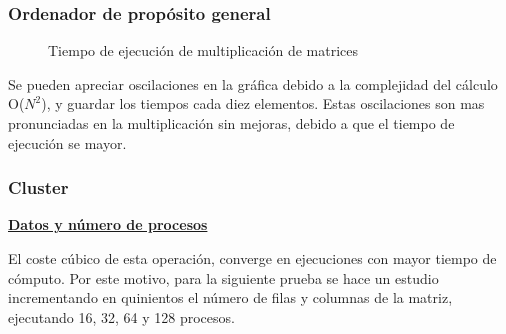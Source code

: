 		
	
		\subsubsection{Ordenador de propósito general}
		
		\begin{figure}[!h]
		\centering
		\caption{Tiempo de ejecución de multiplicación de matrices}
		\end{figure}
		
		Se pueden apreciar oscilaciones en la gráfica debido a la complejidad del cálculo O($N^{2}$), y guardar los tiempos cada diez elementos. Estas oscilaciones son mas pronunciadas en la multiplicación sin mejoras, debido a que el tiempo de ejecución se mayor.
		\newpage
		
		\subsubsection{Cluster}
		
			\begin{flushleft}
			\begin{mdframed}[roundcorner=5pt]			
				\textbf{\underline{Datos y número de procesos}}
				\vspace{0.1cm}
				
				\scriptsize	
				El coste cúbico de esta operación, converge en ejecuciones con mayor tiempo de cómputo. Por este motivo, para la siguiente prueba se hace un estudio incrementando en quinientos el número de filas y columnas de la matriz, ejecutando 16, 32, 64 y 128 procesos.				
			\end{mdframed}
			\end{flushleft}	


